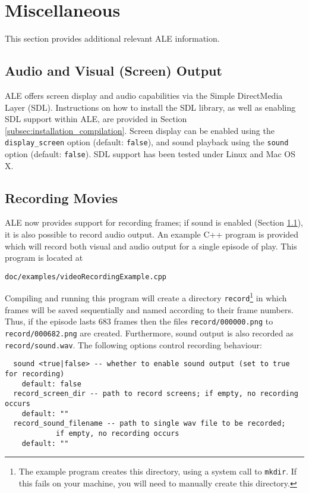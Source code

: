 \documentclass[12pt]{article}
\begin{document}
\section{Miscellaneous}

This section provides additional relevant ALE information.

\subsection{Audio and Visual (Screen) Output}\label{subsec:displaying_screen}

ALE offers screen display and audio capabilities via the Simple DirectMedia Layer (SDL).
Instructions on how to install the SDL library, as well as enabling SDL support within ALE, are provided in Section \ref{subsec:installation_compilation}. 
Screen display can be enabled using the \verb+display_screen+ option (default: \verb+false+), 
and sound playback using the \verb+sound+ option (default: \verb+false+).
SDL support has been tested under Linux and Mac OS X. 

\subsection{Recording Movies}

ALE now provides support for recording frames; if sound is enabled (Section \ref{subsec:displaying_screen}), it is also possible to record audio output.
An example C++ program is provided which will record both visual and audio output for a single episode of play. This program is located at

\begin{center}
\texttt{doc/examples/videoRecordingExample.cpp}
\end{center}

Compiling and running this program will create a directory \texttt{record}\footnote{The example program creates this directory, using a system call to \texttt{mkdir}. If this fails on your machine, you will need to manually create this directory.} in which frames will be saved sequentially and named according to their frame numbers. Thus, if the episode lasts 683 frames then the files \verb+record/000000.png+ to \verb+record/000682.png+ are created. Furthermore, sound output is also recorded as \verb+record/sound.wav+. The following options control recording behaviour:

\small{
\begin{verbatim}
  sound <true|false> -- whether to enable sound output (set to true for recording)
    default: false
  record_screen_dir -- path to record screens; if empty, no recording occurs
    default: ""
  record_sound_filename -- path to single wav file to be recorded; 
            if empty, no recording occurs
    default: ""
\end{verbatim}
}
\end{document}
